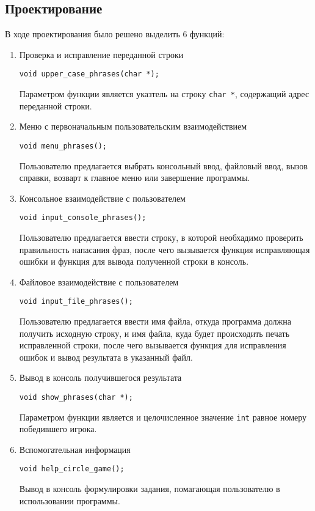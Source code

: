 \documentclass[12pt,a4paper]{report}
\begin{document}
\subsection{Проектирование}
\hspace{\parindent}В ходе проектирования было решено выделить 6 функций:
\begin{enumerate}
 	\item Проверка и исправление переданной строки
 	
 	\verb+void upper_case_phrases(char *);+
 	
	Параметром функции является указтель на строку \verb+char *+, содержащий адрес переданной строки.	 
		 
		 
	\item Меню с первоначальным пользовательским взаимодействием
	
	\verb+void menu_phrases();+ 
	
	Пользователю предлагается выбрать консольный ввод, файловый ввод, вызов справки, возварт к главное меню или завершение программы. 	 
		 
	\item Консольное взаимодействие с пользователем
	
	\verb+void input_console_phrases();+

	Пользователю предлагается ввести строку, в которой необхадимо проверить правильность напасания фраз, после чего вызывается функция исправляющая ошибки и функция для вывода полученной строки в консоль.
	
	\item Файловое взаимодействие с пользователем
	
	\verb+void input_file_phrases();+

	Пользователю предлагается ввести имя файла, откуда программа должна получить исходную строку, и имя файла, куда будет происходить печать исправленной строки, после чего вызывается функция для исправления ошибок и вывод результата в указанный файл.
	
	\item Вывод в консоль получившегося результата
	
	\verb+void show_phrases(char *);+

Параметром функции является и целочисленное значение \verb+int+ равное номеру победившего игрока.
	
	
	\item Вспомогательная информация
	
	\verb+void help_circle_game();+
	
	Вывод в консоль формулировки задания, помагающая пользователю в использовании программы.
\end{enumerate}
\end{document}

